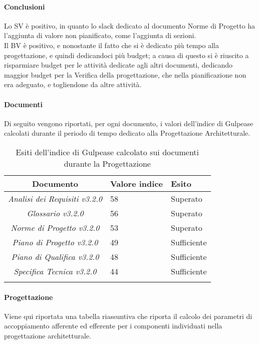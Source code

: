 \paragraph{Conclusioni}
Lo SV è positivo, in quanto lo slack dedicato al documento Norme di Progetto ha  l'aggiunta di valore non pianificato, come l'aggiunta di sezioni.\\
Il BV è positivo, e nonostante il fatto che si è dedicato più tempo alla progettazione, e quindi dedicandoci più budget; a causa di questo si è riuscito a risparmiare budget per le attività dedicate agli altri documenti, dedicando maggior budget per la Verifica della progettazione, che nella pianificazione non era adeguato, e togliendone da altre attività.

\paragraph{Documenti}
Di seguito vengono riportati, per ogni documento, i valori dell'indice di Gulpease calcolati durante il periodo di tempo dedicato alla Progettazione Architetturale.

\begin{longtable}{|c|p{3cm}|p{3cm}|}
\toprule
\textbf{Documento} & \textbf{Valore indice} & \textbf{Esito} \\


\midrule
\emph{Analisi dei Requisiti v3.2.0} & 58 & Superato \\
\midrule
\emph{Glossario v3.2.0} & 56 & Superato \\
\midrule
\emph{Norme di Progetto v3.2.0} & 53  & Superato\\
\midrule
\emph{Piano di Progetto v3.2.0} & 49  & Sufficiente\\
\midrule
\emph{Piano di Qualifica v3.2.0} & 48  & Sufficiente\\
\midrule
\emph{Specifica Tecnica v3.2.0} & 44 & Sufficiente\\
\bottomrule
\caption{Esiti dell'indice di Gulpease calcolato sui documenti durante la Progettazione}
\label{tab:changelog}
\end{longtable}

\paragraph{Progettazione}
Viene qui riportata una tabella riassuntiva che riporta il calcolo dei parametri di accoppiamento afferente ed efferente per i componenti individuati nella progettazione architetturale.

